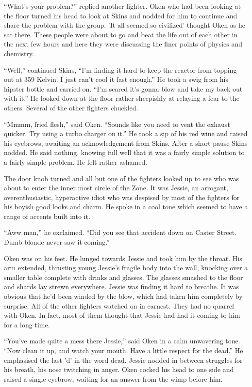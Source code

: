 ``What's your problem?'' replied another fighter. Oken who had been looking at the floor turned his head to look at Skins and nodded for him to continue and share the problem with the group. 'It all seemed so civilized' thought Oken as he sat there. These people were about to go and beat the life out of each other in the next few hours and here they were discussing the finer points of physics and chemistry.

``Well,'' continued Skins, ``I'm finding it hard to keep the reactor from topping out at 359 Kelvin. I just can't cool it fast enough.'' He took a swig from his hipster bottle and carried on. ``I'm scared it's gonna blow and take my back out with it.'' He looked down at the floor rather sheepishly at relaying a fear to the others. Several of the other fighters chuckled.

``Mmmm, fried flesh,'' said Oken. ``Sounds like you need to vent the exhaust quicker. Try using a turbo charger on it.'' He took a sip of his red wine and raised his eyebrows, awaiting an acknowledgement from Skins. After a short pause Skins nodded. He said nothing, knowing full well that it was a fairly simple solution to a fairly simple problem. He felt rather ashamed.

The door knob turned and all but one of the fighters looked up to see who was about to enter the inner most circle of the Zone. It was Jessie, an arrogant, overenthusiastic, hyperactive idiot who was despised by most of the fighters for his boyish good looks and charm. He spoke in a cool tone which seemed to have a range of accents built into it.

``Aww man,'' he exclaimed. ``Did you see that accident down on Caster Street. Dumb blonde never saw it coming.''

Oken was on his feet. He lunged towards Jessie and took him by the throat. His arm extended, thrusting young Jessie's fragile body into the wall, knocking over a smaller table complete with drinks and glasses. The glasses smashed to the floor and shards lay strewn everywhere. Jessie was finding it hard to breathe. It was obvious that he'd been winded by the blow, which had taken him completely by surprise. All of the other fighters watched on in earnest. They had no quarrel with Oken. In fact, most of them thought that Jessie had had it coming to him for a long time.

``You've made quite a mess there Jessie,'' said Oken in a calm unwavering tone. ``Now clean it up, and watch your mouth. Have a little respect for the dead.'' He emphasised the last 'd' in the word dead. Jessie nodded in between struggles for his breath, his nose twitching in anger. Oken cocked his head to one side and raised a single eyebrow, waiting for an answer from the wimp before him.

